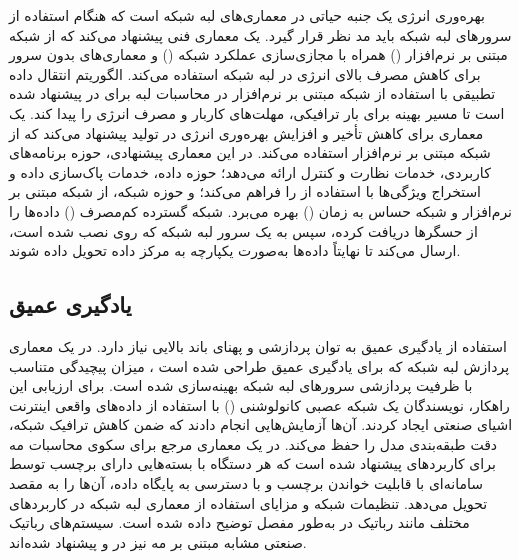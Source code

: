 بهره‌وری انرژی یک جنبه حیاتی در معماری‌های لبه شبکه است که هنگام استفاده از سرورهای لبه شبکه باید مد نظر قرار گیرد. \cite{djemame2021energy} یک معماری فنی پیشنهاد می‌کند که از شبکه مبتنی بر نرم‌افزار () همراه با مجازی‌سازی عملکرد شبکه ()  و معماری‌های بدون سرور برای کاهش مصرف بالای انرژی در لبه شبکه استفاده می‌کند. الگوریتم انتقال داده تطبیقی با استفاده از شبکه مبتنی بر نرم‌افزار در محاسبات لبه برای  در \cite{li2018adaptive} پیشنهاد شده است تا مسیر بهینه برای بار ترافیکی، مهلت‌های کاربار و مصرف انرژی را پیدا کند. \cite{chalapathi2021iioT} یک معماری برای کاهش تأخیر و افزایش بهره‌وری انرژی در تولید پیشنهاد می‌کند که از شبکه مبتنی بر نرم‌افزار استفاده می‌کند. در این معماری پیشنهادی، حوزه برنامه‌های کاربردی، خدمات نظارت و کنترل ارائه می‌دهد؛ حوزه داده، خدمات پاک‌سازی داده و استخراج ویژگی‌ها با استفاده از  را فراهم می‌کند؛ و حوزه شبکه، از شبکه مبتنی بر نرم‌افزار و شبکه حساس به زمان () بهره می‌برد. شبکه گسترده کم‌مصرف () داده‌ها را از حسگرها دریافت کرده، سپس به یک سرور لبه شبکه که  روی  نصب شده است، ارسال می‌کند تا نهایتاً داده‌ها به‌صورت یکپارچه به مرکز داده تحویل داده شوند.

\subsection{یادگیری عمیق}

استفاده از یادگیری عمیق به توان پردازشی و پهنای باند بالایی نیاز دارد. در یک معماری پردازش لبه‌ شبکه که برای یادگیری عمیق طراحی شده است \cite{liang2020edge}، میزان پیچیدگی متناسب با ظرفیت پردازشی سرور‌های لبه‌ شبکه بهینه‌سازی شده است. برای ارزیابی این راهکار، نویسندگان یک شبکه عصبی کانولوشنی () با استفاده از داده‌های واقعی اینترنت اشیای صنعتی ایجاد کردند. آن‌ها آزمایش‌هایی انجام دادند که ضمن کاهش ترافیک شبکه، دقت طبقه‌بندی مدل را حفظ می‌کند. در \cite{pop2021fora} یک معماری مرجع برای سکوی محاسبات مه برای کاربردهای  پیشنهاد شده است که هر دستگاه با بسته‌هایی دارای برچسب‌ توسط سامانه‌ای با قابلیت خواندن برچسب و با دسترسی به پایگاه داده، آن‌ها را به مقصد تحویل می‌دهد. تنظیمات شبکه و مزایای استفاده از معماری لبه شبکه در کاربردهای مختلف مانند رباتیک در \cite{barzegaran2020fogification} به‌طور مفصل توضیح داده شده است. سیستم‌های رباتیک صنعتی مشابه مبتنی بر مه نیز در \cite{shaik2020fog} و \cite{denzler2020consolidating} پیشنهاد شده‌اند.

